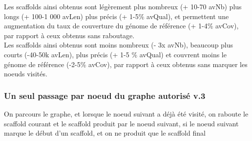 \documentclass[12pt]{article}
\begin{document}
Les scaffolds ainsi obtenus sont légèrement plus nombreux (+ 10-70 avNb) plus longs (+ 100-1 000 avLen) plus précis (+ 1-5\% avQual), et  permettent une augmentation du taux de couverture du génome de référence (+ 1-4\% avCov), par rapport à ceux obtenus sans raboutage. \\

Les scaffolds ainsi obtenus sont moins nombreux (- 3x avNb), beaucoup plus courts (-40-50k avLen), plus précis (+ 1-5 \% avQual) et couvrent  moins le génome de référence (-2-5\% avCov), par rapport à ceux obtenus sans marquer les noeuds visités. \\

\subsubsection{Un seul passage par noeud du graphe autorisé v.3}

On parcours le graphe, et lorsque le noeud suivant a déjà été visité, on raboute le scaffold courant et le scaffold produit par le noeud suivant, si le noeud suivant marque le début d'un scaffold, et on ne produit que le scaffold final \\

\begin{table}[H]
	\caption{Stats sur scaffolds produits par notre méthode. |al| max = 500 ; maxGap = 10k}
	\label{tabGA3}
\end{table}
\end{document}
